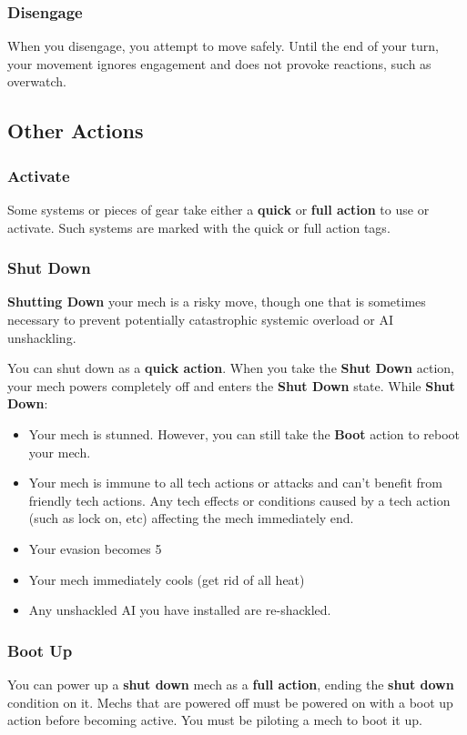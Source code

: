 \subsubsection{Disengage}
When you disengage, you attempt to move safely. Until the end of your turn, your movement ignores engagement and does not provoke reactions, such as overwatch.

\subsection{Other Actions}
\subsubsection{Activate}
Some systems or pieces of gear take either a \textbf{quick} or \textbf{full action} to use or activate. Such systems are marked with the quick or full action tags.

\subsubsection{Shut Down}                                
\textbf{Shutting Down} your mech is a risky move, though one that is sometimes necessary to prevent potentially catastrophic systemic overload or AI unshackling. 

You can shut down as a \textbf{quick action}. When you take the \textbf{Shut Down} action, your mech powers completely off and enters the \textbf{Shut Down} state. While \textbf{Shut Down}:
\begin{itemize}
    \item Your mech is stunned. However, you can still take the \textbf{Boot} action to reboot your mech.
    \item Your mech is immune to all tech actions or attacks and can’t benefit from friendly tech actions. Any tech effects or conditions caused by a tech action (such as lock on, etc) affecting the mech immediately end.
    \item Your evasion becomes 5
    \item Your mech immediately cools (get rid of all heat)
    \item Any unshackled AI you have installed are re-shackled.
\end{itemize}


\subsubsection{Boot Up}
You can power up a \textbf{shut down} mech as a \textbf{full action}, ending the \textbf{shut down} condition on it. Mechs that are powered off must be powered on with a boot up action before becoming active. You must be piloting a mech to boot it up.


